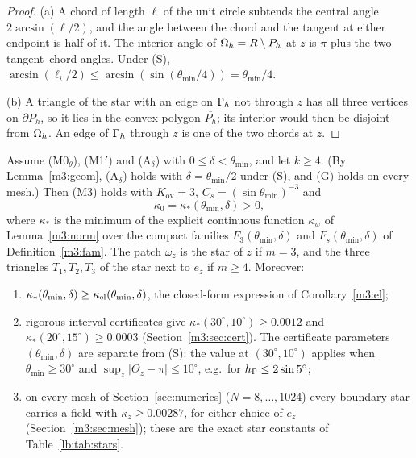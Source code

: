 \begin{proof}
(a) A chord of length $\ell$ of the unit circle subtends the central angle $2\arcsin(\ell/2)$, and the angle between the chord and the tangent at either endpoint is half of it. The interior angle of $\Omega_h=R\setminus P_h$ at $z$ is $\pi$ plus the two tangent--chord angles. Under (S), $\arcsin(\ell_i/2)\le\arcsin(\sin(\theta_{\min}/4))=\theta_{\min}/4$.

(b) A triangle of the star with an edge on $\Gamma_h$ not through $z$ has all three vertices on $\partial P_h$, so it lies in the convex polygon $\overline{P_h}$; its interior would then be disjoint from $\Omega_h$. An edge of $\Gamma_h$ through $z$ is one of the two chords at $z$.
\end{proof}
\begin{theorem}\label{m3:thm}
Assume (M0$_\theta$), (M1$'$) and (A$_\delta$) with $0\le\delta<\theta_{\min}$, and let $k\ge4$. (By Lemma~\ref{m3:geom}, (A$_\delta$) holds with $\delta=\theta_{\min}/2$ under (S), and (G) holds on every mesh.) Then (M3) holds with $K_{\mathrm{ov}}=3$, $C_s=(\sin\theta_{\min})^{-3}$ and
\[
\kappa_0=\kappa_\ast(\theta_{\min},\delta)>0,
\]
where $\kappa_\ast$ is the minimum of the explicit continuous function $\kappa_w$ of Lemma~\ref{m3:norm} over the compact families $F_3(\theta_{\min},\delta)$ and $F_s(\theta_{\min},\delta)$ of Definition~\ref{m3:fam}. The patch $\omega_z$ is the star of $z$ if $m=3$, and the three triangles $T_1,T_2,T_3$ of the star next to $e_z$ if $m\ge4$. Moreover:
\begin{enumerate}[label=(\alph*)]
\item $\kappa_\ast(\theta_{\min},\delta)\ge\kappa_{\rm el}(\theta_{\min},\delta)$, the closed-form expression of Corollary~\ref{m3:el};
\item rigorous interval certificates give $\kappa_\ast(30^\circ,10^\circ)\ge0.0012$ and $\kappa_\ast(20^\circ,15^\circ)\ge0.0003$ (Section~\ref{m3:sec:cert}). The certificate parameters $(\theta_{\min},\delta)$ are separate from (S): the value at $(30^\circ,10^\circ)$ applies when $\theta_{\min}\ge30^\circ$ and $\sup_z|\Theta_z-\pi|\le10^\circ$, e.g.\ for $h_\Gamma\le2\sin5^\circ$;
\item on every mesh of Section~\ref{sec:numerics} ($N=8,\dots,1024$) every boundary star carries a field with $\kappa_z\ge0.00287$, for either choice of $e_z$ (Section~\ref{m3:sec:mesh}); these are the exact star constants of Table~\ref{lb:tab:stars}.
\end{enumerate}
\end{theorem}

